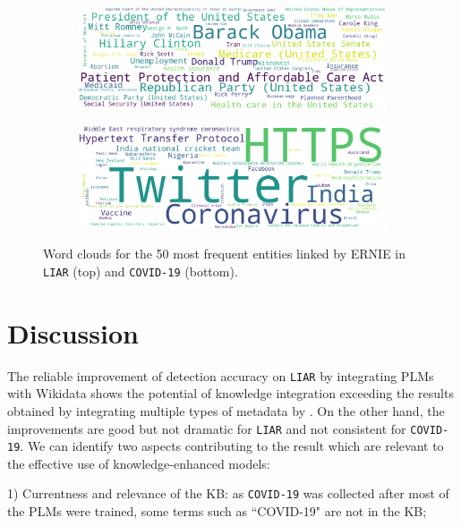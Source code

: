 \documentclass[letterpaper]{article} %
\begin{document}
 \begin{figure}
\centering
\begin{subfigure}[b]{0.46\textwidth}
\centering
\includegraphics[width=\textwidth]{imgs/liar50.png}
\label{fig:e1}
\end{subfigure}
\hfill
\begin{subfigure}[b]{0.46\textwidth}

\includegraphics[width=\textwidth]{imgs/covid50.png}
\label{fig:e2}
\end{subfigure}
\caption{Word clouds for the 50 most frequent entities linked by ERNIE in  \texttt{LIAR} (top) and  \texttt{COVID-19} (bottom).}
\label{fig:word_cloud_Ernie}
\end{figure}



\section{Discussion}

The reliable improvement of detection accuracy on \texttt{LIAR} by integrating PLMs with Wikidata shows the potential of knowledge integration exceeding the results obtained by integrating multiple types of metadata by \citet{wang-2017-liar}. 
On the other hand, the improvements are good but not dramatic for \texttt{LIAR} and not consistent for \texttt{COVID-19}. 
We can identify two aspects contributing to the result which are relevant to the effective use of knowledge-enhanced models: 

1) Currentness and relevance of the KB: as \texttt{COVID-19} was collected after most of the PLMs were trained, some terms such as ``COVID-19" are not in the KB; 
\end{document}
